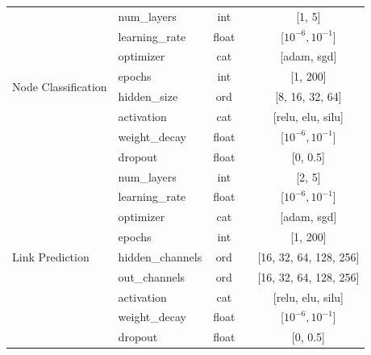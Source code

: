 \documentclass{article}
\newcommand{\cmark}{\ding{51}} %
\newcommand{\xmark}{\ding{55}} %
\begin{document}
\begin{longtable}{@{}p{}lccc@{}}
\multirow{8}{=}{Node Classification} &  num\_layers          & int   & \textcolor{crosscolor}{\xmark} & [1, 5] \\
                                & learning\_rate       & float & \textcolor{checkcolor}{\cmark} & [$10^{-6}, 10^{-1}$] \\
                                & optimizer            & cat   & \textcolor{crosscolor}{\xmark} & [adam, sgd] \\
                                & epochs          & int   & \textcolor{crosscolor}{\xmark} & [1, 200] \\
                                & hidden\_size         & ord   & \textcolor{crosscolor}{\xmark} & [8, 16, 32, 64] \\
                                & activation           & cat   & \textcolor{crosscolor}{\xmark} & [relu, elu, silu] \\
                                & weight\_decay & float & \textcolor{checkcolor}{\cmark} & [$10^{-6}, 10^{-1}$] \\
                                & dropout & float & \textcolor{crosscolor}{\xmark} & [0, 0.5] \\
\midrule
\multirow{9}{*}{Link Prediction} & num\_layers        & int   & \textcolor{crosscolor}{\xmark} & [2, 5] \\
                                 & learning\_rate     & float & \textcolor{checkcolor}{\cmark} & [$10^{-6}, 10^{-1}$] \\
                                 & optimizer          & cat   & \textcolor{crosscolor}{\xmark} & [adam, sgd] \\
                                 & epochs        & int   & \textcolor{crosscolor}{\xmark} & [1, 200] \\
                                 & hidden\_channels   & ord   & \textcolor{crosscolor}{
\xmark} & [16, 32, 64, 128, 256] \\
& out\_channels & ord & \textcolor{crosscolor}{\xmark} & [16, 32, 64, 128, 256] \\
& activation & cat & \textcolor{crosscolor}{\xmark} & [relu, elu, silu] \\
& weight\_decay & float & \textcolor{checkcolor}{\cmark} & [$10^{-6}, 10^{-1}$] \\
& dropout & float & \textcolor{crosscolor}{\xmark} & [0, 0.5] \\
\bottomrule
\end{longtable}
\end{document}
